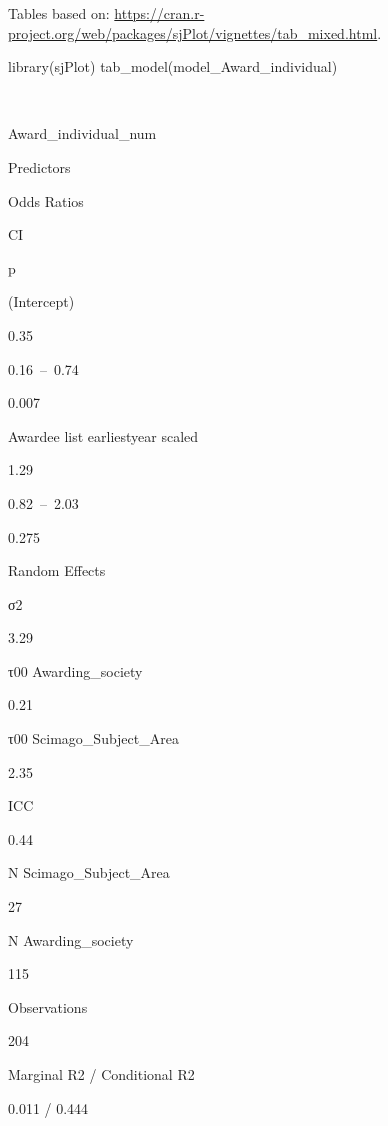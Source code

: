 \documentclass[
]{article}
\newenvironment{Shaded}{\begin{snugshade}}{\end{snugshade}}
\newcommand{\FunctionTok}[1]{\textcolor[rgb]{0.00,0.00,0.00}{#1}}
\newcommand{\NormalTok}[1]{#1}
\begin{document}
Tables based on:
\url{https://cran.r-project.org/web/packages/sjPlot/vignettes/tab_mixed.html}.

\begin{Shaded}
\begin{Highlighting}[]
\FunctionTok{library}\NormalTok{(sjPlot)}
\FunctionTok{tab\_model}\NormalTok{(model\_Award\_individual)}
\end{Highlighting}
\end{Shaded}

~

Award\_individual\_num

Predictors

Odds Ratios

CI

p

(Intercept)

0.35

0.16~--~0.74

0.007

Awardee list earliestyear scaled

1.29

0.82~--~2.03

0.275

Random Effects

σ2

3.29

τ00 Awarding\_society

0.21

τ00 Scimago\_Subject\_Area

2.35

ICC

0.44

N Scimago\_Subject\_Area

27

N Awarding\_society

115

Observations

204

Marginal R2 / Conditional R2

0.011 / 0.444
\end{document}
